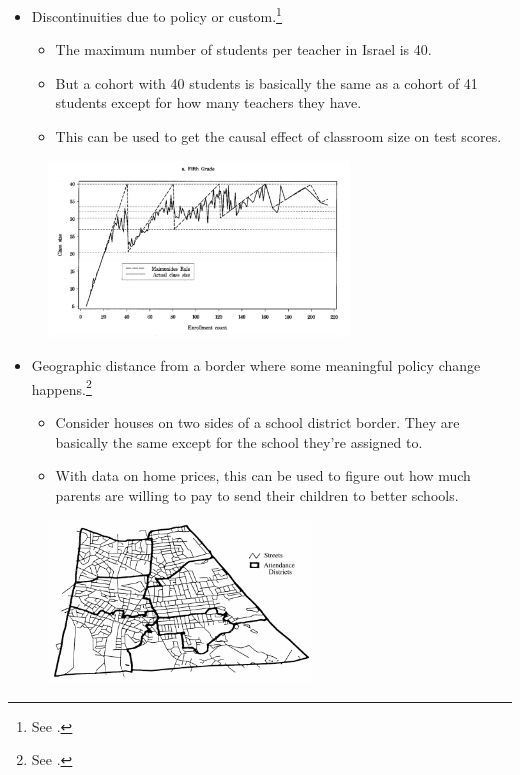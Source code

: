 \documentclass{beamer}
\begin{document}
\begin{frame}
	\begin{itemize}
		\item Discontinuities due to policy or custom.\footnote{See \cite{angrist1999using}.}
		\begin{itemize}
			\item The maximum number of students per teacher in Israel is 40.
			\item But a cohort with 40 students is basically the same as a cohort of 41 students except for how many teachers they have.
			\item This can be used to get the causal effect of classroom size on test scores.
		\end{itemize}
	\end{itemize}
	\begin{figure}
		\includegraphics[width=8cm]{angrist-maimonedes.png}
		\centering
	\end{figure}
\end{frame}

\begin{frame}
	\begin{itemize}
		\item Geographic distance from a border where some meaningful policy change happens.\footnote{See \cite{black1999better}.}
		\begin{itemize}
			\item Consider houses on two sides of a school district border. They are basically the same except for the school they're assigned to.
			\item With data on home prices, this can be used to figure out how much parents are willing to pay to send their children to better schools.
		\end{itemize}
	\end{itemize}
	\begin{figure}
		\includegraphics[width=7cm]{black-schools.png}
		\centering
	\end{figure}
\end{frame}
\end{document}
